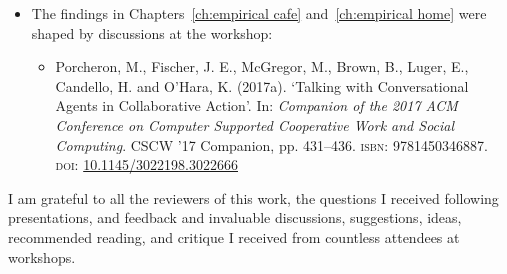 \begin{itemize}
\begin{itemize}
    \end{itemize}





    \item The findings in Chapters~\ref{ch:empirical cafe} and~\ref{ch:empirical home} were shaped by discussions at the workshop:
    \begin{itemize}

        \item Porcheron, M., Fischer, J. E., McGregor, M., Brown, B., Luger, E., Candello, H. and O’Hara, K. (2017a). ‘Talking with Conversational Agents in Collaborative Action’. In: \textit{Companion of the 2017 ACM Conference on Computer Supported Cooperative Work and Social Computing}. CSCW ’17 Companion, pp. 431–436. \textsc{isbn:} 9781450346887. \textsc{doi:} \href{https://doi.org/10.1145/3022198.3022666}{10.1145/3022198.3022666}

    \end{itemize}

\end{itemize}

I am grateful to all the reviewers of this work, the questions I received following presentations, and feedback and invaluable discussions, suggestions, ideas, recommended reading, and critique I received from countless attendees at workshops.